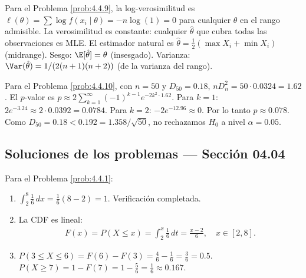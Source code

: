\begin{sugerencia}
	\label{sug:4.4.9}
	Para el Problema \ref{prob:4.4.9}, la log-verosimilitud es $\ell(\theta) = \sum \log f(x_i \mid \theta) = -n \log(1) = 0$ para cualquier $\theta$ en el rango admisible. La verosimilitud es constante: cualquier $\hat{\theta}$ que cubra todas las observaciones es MLE. El estimador natural es $\hat{\theta} = \frac{1}{2}(\max X_i + \min X_i)$ (midrange). Sesgo: $\E[\hat{\theta}] = \theta$ (insesgado). Varianza: $\Var(\hat{\theta}) = 1/(2(n+1)(n+2))$ (de la varianza del rango).
\end{sugerencia}

\begin{sugerencia}
	\label{sug:4.4.10}
	Para el Problema \ref{prob:4.4.10}, con $n = 50$ y $D_{50} = 0.18$, $nD_{n}^{2} = 50 \cdot 0.0324 = 1.62$. El $p$-valor es $p \approx 2 \sum_{k=1}^{\infty}(-1)^{k-1} e^{-2k^{2} \cdot 1.62}$. Para $k=1$: $2 e^{-3.24} \approx 2 \cdot 0.0392 = 0.0784$. Para $k=2$: $-2 e^{-12.96} \approx 0$. Por lo tanto $p \approx 0.078$. Como $D_{50} = 0.18 < 0.192 = 1.358/\sqrt{50}$, no rechazamos $H_{0}$ a nivel $\alpha = 0.05$.
\end{sugerencia}

\subsection*{Soluciones de los problemas --- Sección 04.04}

\begin{solucion}
	\label{sol:4.4.1}
	Para el Problema \ref{prob:4.4.1}:
	\begin{enumerate}
		\item $\int_{2}^{8} \frac{1}{6}\,dx = \frac{1}{6}(8-2) = 1$. Verificación completada.
		\item La CDF es lineal:
		\begin{align*}
			F(x) = P(X \le x) = \int_{2}^{x} \frac{1}{6}\,dt = \frac{x-2}{6}, \quad x \in [2, 8].
		\end{align*}
		\item $P(3 \le X \le 6) = F(6) - F(3) = \frac{4}{6} - \frac{1}{6} = \frac{3}{6} = 0.5$. $P(X \ge 7) = 1 - F(7) = 1 - \frac{5}{6} = \frac{1}{6} \approx 0.167$.
	\end{enumerate}
\end{solucion}

